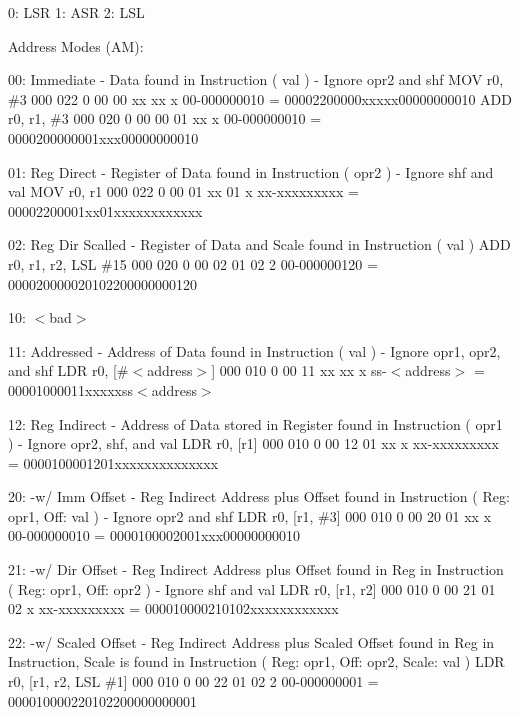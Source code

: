\documentclass[12pt]{article}
\begin{document}
    0: LSR
    1: ASR
    2: LSL
        
Address Modes (AM):
    
    00:     Immediate -         Data found in Instruction ( val ) - Ignore opr2 and shf
        MOV     r0, $\#$3          000 022 0 00 00 xx xx x 00-000000010 = 00002200000xxxxx00000000010
        ADD     r0, r1, $\#$3      000 020 0 00 00 01 xx x 00-000000010 = 0000200000001xxx00000000010
        
    01:     Reg Direct -        Register of Data found in Instruction ( opr2 ) - Ignore shf and val
        MOV     r0, r1          000 022 0 00 01 xx 01 x xx-xxxxxxxxx = 00002200001xx01xxxxxxxxxxxx
        
    02:     Reg Dir Scalled -   Register of Data and Scale found in Instruction ( val )
        ADD     r0, r1, r2, LSL $\#$15
                                000 020 0 00 02 01 02 2 00-000000120 = 000020000020102200000000120
    
    10:     $<$bad$>$
        
    11:     Addressed -         Address of Data found in Instruction ( val ) - Ignore opr1, opr2, and shf
        LDR     r0, [$\#$$<$address$>$]
                                000 010 0 00 11 xx xx x ss-$<$address$>$ = 00001000011xxxxxss$<$address$>$
        
    12:     Reg Indirect -      Address of Data stored in Register found in Instruction ( opr1 ) - Ignore opr2, shf, and val
        LDR     r0, [r1]        000 010 0 00 12 01 xx x xx-xxxxxxxxx = 0000100001201xxxxxxxxxxxxxx
        
    20:     -w/ Imm Offset -    Reg Indirect Address plus Offset found in Instruction ( Reg: opr1, Off: val ) - Ignore opr2 and shf
        LDR     r0, [r1, $\#$3]    000 010 0 00 20 01 xx x 00-000000010 = 0000100002001xxx00000000010
        
    21:     -w/ Dir Offset -    Reg Indirect Address plus Offset found in Reg in Instruction ( Reg: opr1, Off: opr2 ) - Ignore shf and val
        LDR     r0, [r1, r2]    000 010 0 00 21 01 02 x xx-xxxxxxxxx = 000010000210102xxxxxxxxxxxx
                                
    22:     -w/ Scaled Offset - Reg Indirect Address plus Scaled Offset found in Reg in Instruction, Scale is found in Instruction
                                ( Reg: opr1, Off: opr2, Scale: val )
        LDR     r0, [r1, r2, LSL $\#$1]
                                000 010 0 00 22 01 02 2 00-000000001 = 000010000220102200000000001
    
\end{document}
